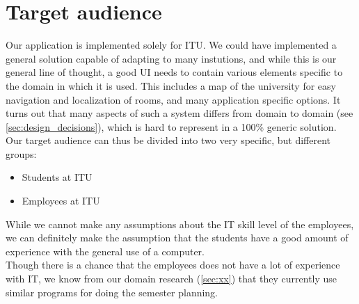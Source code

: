 \section{Target audience} %
\label{sec:target_audience}
Our application is implemented solely for ITU. We could have implemented a general solution capable of adapting to many instutions, and while this is our general line of thought, a good UI needs to contain various elements specific to the domain in which it is used. This includes a map of the university for easy navigation and localization of rooms, and many application specific options. It turns out that many aspects of such a system differs from domain to domain (see \ref{sec:design_decisions}), which is hard to represent in a 100\% generic solution.\\

Our target audience can thus be divided into two very specific, but different groups:
\begin{itemize}
\item Students at ITU
\item Employees at ITU
\end{itemize}

While we cannot make any assumptions about the IT skill level of the employees, we can definitely make the assumption that the students have a good amount of experience with the general use of a computer. \\
Though there is a chance that the employees does not have a lot of experience with IT, we know from our domain research (\ref{sec:xx}) that they currently use similar programs for doing the semester planning. \\



